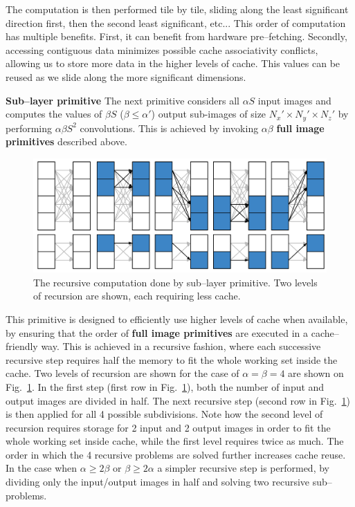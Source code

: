   The computation is then performed tile by tile, sliding along the
  least significant direction first, then the second least
  significant, etc...  This order of computation has multiple
  benefits.  First, it can benefit from hardware pre--fetching.
  Secondly, accessing contiguous data minimizes possible cache
  associativity conflicts, allowing us to store more data in the
  higher levels of cache.  This values can be reused as we slide along
  the more significant dimensions.

  {\bf Sub--layer primitive} \quad The next primitive considers all
  $\alpha S$ input images and computes the values of $\beta S$ ($\beta
  \le \alpha'$) output sub-images of size $N_x' \times N_y' \times
  N_z'$ by performing $\alpha \beta S^2$ convolutions.  This is
  achieved by invoking $\alpha \beta$ {\bf full image primitives}
  described above.

  \begin{figure}
    \begin{center}
      \includegraphics[width=0.8\linewidth]{fig/serialexec}
    \end{center}
    \caption{The recursive computation done by sub--layer primitive.
      Two levels of recursion are shown, each requiring less cache. }
    \label{fig:full-exec}
  \end{figure}

  This primitive is designed to efficiently use higher levels of cache
  when available, by ensuring that the order of {\bf full image
    primitives} are executed in a cache--friendly way.  This is
  achieved in a recursive fashion, where each successive recursive
  step requires half the memory to fit the whole working set inside
  the cache.  Two levels of recursion are shown for the case of
  $\alpha = \beta = 4$ are shown on Fig.~\ref{fig:full-exec}.  In the
  first step (first row in Fig.~\ref{fig:full-exec}), both the number
  of input and output images are divided in half.  The next recursive
  step (second row in Fig.~\ref{fig:full-exec}) is then applied for
  all 4 possible subdivisions.  Note how the second level of recursion
  requires storage for 2 input and 2 output images in order to fit the
  whole working set inside cache, while the first level requires twice
  as much.  The order in which the 4 recursive problems are solved
  further increases cache reuse.  In the case when $\alpha \ge 2\beta$
  or $\beta \ge 2\alpha$ a simpler recursive step is performed, by
  dividing only the input/output images in half and solving two
  recursive sub--problems.


